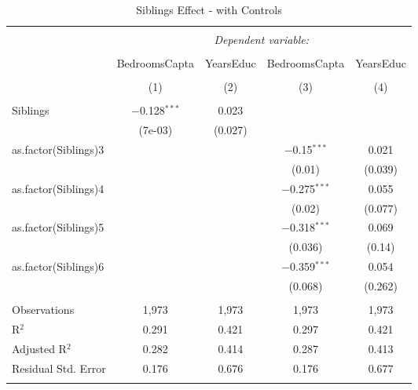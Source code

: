 
\begin{table}[!htbp] \centering 
  \caption{Siblings Effect - with Controls} 
  \label{} 
\begin{tabular}{@{\extracolsep{5pt}}lcccc} 
\\[-1.8ex]\hline 
\hline \\[-1.8ex] 
 & \multicolumn{4}{c}{\textit{Dependent variable:}} \\ 
\cline{2-5} 
\\[-1.8ex] & BedroomsCapta & YearsEduc & BedroomsCapta & YearsEduc \\ 
\\[-1.8ex] & (1) & (2) & (3) & (4)\\ 
\hline \\[-1.8ex] 
 Siblings & $-$0.128$^{***}$ & 0.023 &  &  \\ 
  & (7e-03) & (0.027) &  &  \\ 
  as.factor(Siblings)3 &  &  & $-$0.15$^{***}$ & 0.021 \\ 
  &  &  & (0.01) & (0.039) \\ 
  as.factor(Siblings)4 &  &  & $-$0.275$^{***}$ & 0.055 \\ 
  &  &  & (0.02) & (0.077) \\ 
  as.factor(Siblings)5 &  &  & $-$0.318$^{***}$ & 0.069 \\ 
  &  &  & (0.036) & (0.14) \\ 
  as.factor(Siblings)6 &  &  & $-$0.359$^{***}$ & 0.054 \\ 
  &  &  & (0.068) & (0.262) \\ 
 \hline \\[-1.8ex] 
Observations & 1,973 & 1,973 & 1,973 & 1,973 \\ 
R$^{2}$ & 0.291 & 0.421 & 0.297 & 0.421 \\ 
Adjusted R$^{2}$ & 0.282 & 0.414 & 0.287 & 0.413 \\ 
Residual Std. Error & 0.176 & 0.676 & 0.176 & 0.677 \\ 
\hline 
\hline \\[-1.8ex] 
\end{tabular} 
\end{table} 
